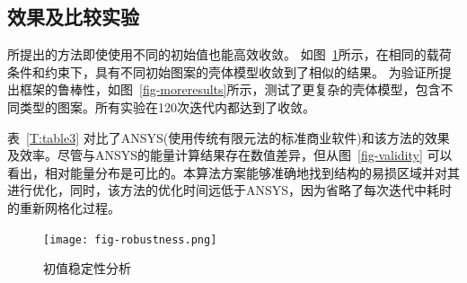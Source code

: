 \subsection{效果及比较实验}
所提出的方法即使使用不同的初始值也能高效收敛。
如图~\ref{fig-initialRobustness}所示，在相同的载荷条件和约束下，具有不同初始图案的壳体模型收敛到了相似的结果。
为验证所提出框架的鲁棒性，如图~\ref{fig-moreresults}所示，测试了更复杂的壳体模型，包含不同类型的图案。所有实验在120次迭代内都达到了收敛。

表~\ref{T:table3} 对比了ANSYS(使用传统有限元法的标准商业软件)和该方法的效果及效率。尽管与ANSYS的能量计算结果存在数值差异，但从图~\ref{fig-validity} 可以看出，相对能量分布是可比的。本算法方案能够准确地找到结构的易损区域并对其进行优化，同时，该方法的优化时间远低于ANSYS，因为省略了每次迭代中耗时的重新网格化过程。

\begin{figure}[htbp]
    \centering
    \texttt{[image: fig-robustness.png]}
    \caption{初值稳定性分析}
    \label{fig-initialRobustness}
\end{figure}

